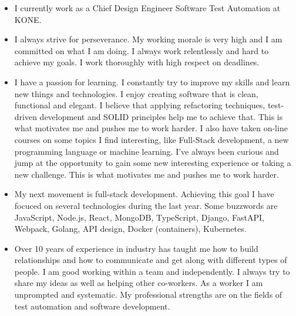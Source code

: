 \documentclass{article} %
\def\bf{\bfseries}
\def\sf{\sffamily}
\def\mydot{\textcolor{deep_blue}{\rule{1ex}{1ex}}}
\begin{document}
\begin{multicols}{2}
\sloppy


\begin{itemize}[leftmargin=2ex, itemsep=0ex]
\item[\mydot]
I currently work as a Chief Design Engineer Software Test Automation at KONE.
\item[\mydot]
I always strive for perseverance. My working morale is very high and I am committed on what I am doing. I always work relentlessly and hard to achieve my goals. I work thoroughly with high respect on deadlines. 
\item[\mydot]
I have a passion for learning. I constantly try to improve my skills and learn new things and technologies. I enjoy creating software that is clean, functional and elegant. I believe that applying refactoring techniques, test-driven development and SOLID principles help me to achieve that. This is what motivates me and pushes me to work harder. I also have taken on-line courses on some topics I find interesting, like Full-Stack development, a new programming language or machine learning. I've always been curious and jump at the opportunity to gain some new interesting experience or taking a new challenge. This is what motivates me and pushes me to work harder.

\item[\mydot]
My next movement is full-stack development. Achieving this goal I have focuced on several technologies during the last year. Some buzzwords are JavaScript, Node.js, React, MongoDB, TypeScript, Django, FastAPI, Webpack, Golang, API design, Docker (containers), Kubernetes.

\item[\mydot]
Over 10 years of experience in industry has taught me how to build relationships and how to communicate and get along with different types of people. I am good working within a team and independently. I always try to share my ideas as well as helping other co-workers. As a worker I am unprompted and systematic. My professional strengths are on the fields of test automation and software development.


\end{itemize}
\end{multicols}
\vspace*{-1.5em}
\fussy
\end{document}
